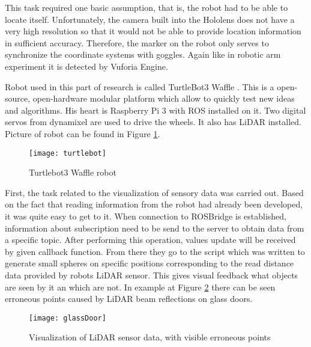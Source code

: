\documentclass[printmode,en]{mgr}
\begin{document}
This task required one basic assumption, that is, the robot had to be able to locate itself. Unfortunately, the camera built into the Hololens does not have a very high resolution so that it would not be able to provide location information in sufficient accuracy. Therefore, the marker on the robot only serves to synchronize the coordinate systems with goggles. Again like in robotic arm experiment it is detected by Vuforia Engine.

Robot used in this part of research is called TurtleBot3 Waffle \cite{turtlebot}. This is a open-source, open-hardware modular platform which allow to quickly test new ideas and algorithms. His heart is Raspberry Pi 3 with ROS installed on it. Two digital servos from dynamixel are used to drive the wheels. It also has LiDAR installed. Picture of robot can be found in Figure \ref{fig:turtlebot}.

\begin{figure}[!ht]
  \centering
    \texttt{[image: turtlebot]}
  \caption{Turtlebot3 Waffle robot}
  \label{fig:turtlebot}
\end{figure}

First, the task related to the visualization of sensory data was carried out. Based on the fact that reading information from the robot had already been developed, it was quite easy to get to it. When connection to ROSBridge is established, information about subscription need to be send to the server to obtain data from a specific topic. After performing this operation, values update will be received by given callback function. From there they go to the script which was written to generate small spheres on specific positions corresponding to the read distance data provided by robots LiDAR sensor. This gives visual feedback what objects are seen by it an which are not. In example at Figure \ref{fig:glassDoor} there can be seen erroneous points caused by LiDAR beam reflections on glass doors.

\begin{figure}[!ht]
  \centering
    \texttt{[image: glassDoor]}
  \caption{Visualization of LiDAR sensor data, with visible erroneous points}
  \label{fig:glassDoor}
\end{figure}
\end{document}
